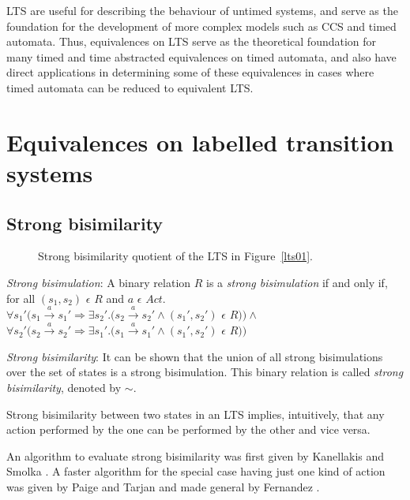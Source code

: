 \documentclass[a4paper]{llncs}
\begin{document}
LTS are useful for describing the behaviour of untimed systems, and
serve as the foundation for the development of more complex models
such as CCS and timed automata. Thus, equivalences on LTS serve
as the theoretical foundation for many timed and time abstracted
equivalences on timed automata, and also have direct applications in
determining some of these equivalences in cases where timed automata
can be reduced to equivalent LTS.

\section{Equivalences on labelled transition systems}

\subsection{Strong bisimilarity}

\begin{SCfigure}
  \centering
  \def\svgwidth{0.5\columnwidth}
  
  \caption{Strong bisimilarity quotient of the LTS in Figure~\ref{lts01}.}
\end{SCfigure}

\begin{definition} 
  \emph{Strong bisimulation}: A binary relation $R$ is a \textit{strong
    bisimulation} if and only if, for all $(s_1, s_2)$ $\epsilon$ $R$ and $a$ $\epsilon$ $Act .$\\
  $\forall s_1' (s_1 \xrightarrow{a} s_1' \Rightarrow \exists s_2'
  . (s_2 \xrightarrow{a} s_2' \wedge (s_1', s_2')$ $\epsilon$ $R ) )
  \wedge $ \\
  $\forall s_2' (s_2 \xrightarrow{a} s_2' \Rightarrow \exists s_1'
  . (s_1 \xrightarrow{a} s_1' \wedge (s_1', s_2')$ $\epsilon$ $R ) )$
\end{definition}

\begin{definition}
  \emph{Strong bisimilarity}: It can be shown that the union of
  all strong bisimulations over the set of states is a strong
  bisimulation. This binary relation is called \textit{strong
    bisimilarity}, denoted by $\sim$.
\end{definition}

Strong bisimilarity between two states in an LTS implies,
intuitively, that any action performed by the one can be performed by
the other and vice versa.

An algorithm to evaluate strong bisimilarity was first given by
Kanellakis and Smolka \cite{kanellakis1990ccs}. A faster algorithm for
the special case having just one kind of action was given by Paige and
Tarjan \cite{paige1987three} and made general by Fernandez
\cite{fernandez1990implementation}.
\end{document}
